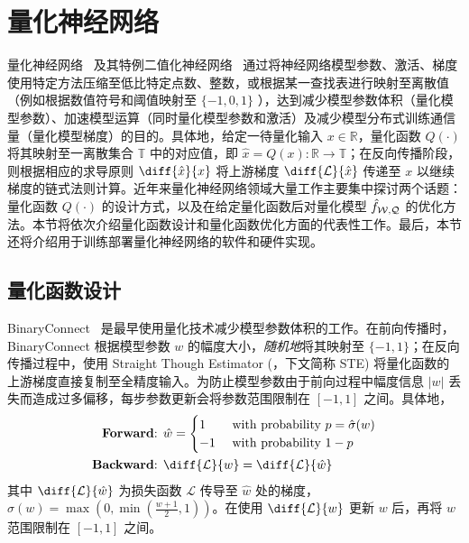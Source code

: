 \section{量化神经网络}
量化神经网络~\citep{guo2018survey} 及其特例二值化神经网络~\citep{qin2020binary} 通过将神经网络模型参数、激活、梯度使用特定方法压缩至低比特定点数、整数，或根据某一查找表进行映射至离散值（例如根据数值符号和阈值映射至 $\{-1, 0, 1\}$ ），达到减少模型参数体积（量化模型参数）、加速模型运算（同时量化模型参数和激活）及减少模型分布式训练通信量（量化模型梯度）的目的。具体地，给定一待量化输入 $x\in \mathbb{R}$，量化函数 $Q(\cdot)$ 将其映射至一离散集合 $\mathbb{T}$ 中的对应值，即 $\hat{x} = Q(x): \mathbb{R} \to \mathbb{T}$；在反向传播阶段，则根据相应的求导原则 $\diff{\hat{x}}{x}$ 将上游梯度 $\diff{\mathcal{L}}{\hat{x}}$ 传递至 $x$ 以继续梯度的链式法则计算。近年来量化神经网络领域大量工作主要集中探讨两个话题：量化函数 $Q(\cdot)$ 的设计方式，以及在给定量化函数后对量化模型 $\hat{f}_{\mathcal{W, Q}}$ 的优化方法。本节将依次介绍量化函数设计和量化函数优化方面的代表性工作。最后，本节还将介绍用于训练部署量化神经网络的软件和硬件实现。
\subsection{量化函数设计}
BinaryConnect~\citep{courbariaux2015binaryconnect} 是最早使用量化技术减少模型参数体积的工作。在前向传播时，BinaryConnect 根据模型参数 $w$ 的幅度大小，\emph{随机地}将其映射至 $\{-1, 1\}$；在反向传播过程中，使用 Straight Though Estimator (\citet{bengio2013estimating}，下文简称 STE) 将量化函数的上游梯度直接复制至全精度输入。为防止模型参数由于前向过程中幅度信息 $|w|$ 丢失而造成过多偏移，每步参数更新会将参数范围限制在 $[-1, 1]$ 之间。具体地，
\begin{align}
  \text{\textbf{Forward}: } & \hat{w} = 
    \begin{cases}
      1 & \text{ with probability } p = \hat{\sigma}(w) \\
      -1 & \text{ with probability } 1 - p
    \end{cases} \\
  \text{\textbf{Backward}: } & \diff{\mathcal{L}}{w} = \diff{\mathcal{L}}{\hat{w}} \label{eq::background::ste}
\end{align}
其中 $\diff{\mathcal{L}}{\hat{w}}$ 为损失函数 $\mathcal{L}$ 传导至 $\hat{w}$ 处的梯度，$\hat{\sigma}(w) = \max(0, \min(\frac{w+1}{2}, 1))$。在使用 $\diff{\mathcal{L}}{w}$ 更新 $w$ 后，再将 $w$ 范围限制在 $[-1, 1]$ 之间。

